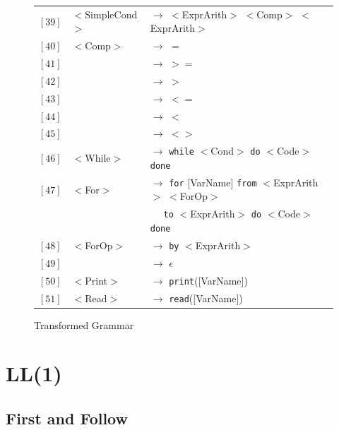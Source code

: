 \documentclass[letterpaper]{article}
\begin{document}
\begin{figure}
\begin{center}
\begin{tabular}{r l l}
                $[39]$ & $<$SimpleCond$>$ & $\rightarrow$
                $<$ExprArith$>$ $<$Comp$>$ $<$ExprArith$>$ \\
                $[40]$ & $<$Comp$>$ & $\rightarrow$ $=$ \\
                $[41]$ & & $\rightarrow$ $>=$ \\
                $[42]$ & & $\rightarrow$ $>$ \\
                $[43]$ & & $\rightarrow$ $<=$ \\
                $[44]$ & & $\rightarrow$ $<$ \\
                $[45]$ & & $\rightarrow$ $<>$ \\

                $[46]$ & $<$While$>$ & $\rightarrow$
                \texttt{while} $<$Cond$>$ \texttt{do}
                $<$Code$>$ \texttt{done} \\
                $[47]$ & $<$For$>$ & $\rightarrow$
                \texttt{for} [VarName] \texttt{from}
                $<$ExprArith$>$ $<$ForOp$>$ \\
                & &
                $\quad$ \texttt{to} $<$ExprArith$>$
                \texttt{do} $<$Code$>$ \texttt{done} \\
                $[48]$ & $<$ForOp$>$ & $\rightarrow$
                \texttt{by} $<$ExprArith$>$ \\
                $[49]$ & & $\rightarrow$ $\epsilon$ \\
                $[50]$ & $<$Print$>$ & $\rightarrow$
                \texttt{print}([VarName]) \\
                $[51]$ & $<$Read$>$ & $\rightarrow$ \texttt{read}([VarName]) \\



            \end{tabular}

    \end{center}
    \caption{Transformed Grammar}
    \label{fig:fullcfg}
\end{figure}

\section{LL(1)}

\subsection{First and Follow}
\end{document}
